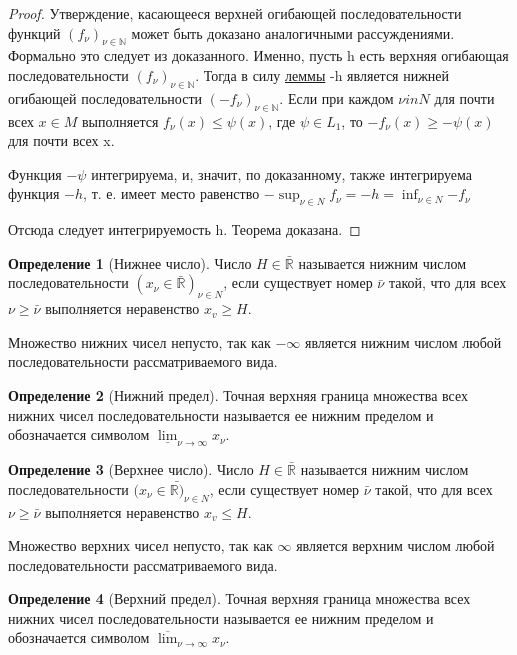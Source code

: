 \documentclass[a4paper]{article}
\theoremstyle{definition}
\newtheorem*{definition}{Определение}
\theoremstyle{remark}
\begin{document}
\begin{proof}
          Утверждение, касающееся верхней огибающей последовательности 
          функций $(f_\nu)_{\nu\in \mathbb{N}}$ может быть доказано аналогичными рассуждениями. 
          Формально это следует из доказанного. Именно, пусть h есть  
          верхняя огибающая последовательности $(f_\nu)_{\nu\in \mathbb{N}}$. Тогда в силу \hyperlink{l4.2}{леммы}
          -h является нижней огибающей последовательности $(-f_\nu)_{\nu\in \mathbb{N}}$.
          Если при каждом $\nu in N$ для почти всех $x\in M$ выполняется $f_\nu(x)\leq \psi(x)$, где 
          $\psi\in L_1$, то $-f_\nu(x)\geq -\psi(x)$ для почти всех x.

          Функция $-\psi$ интегрируема, и, значит, по доказанному, также  
          интегрируема функция $-h$, т. е. имеет место равенство 
          $-\sup_{\nu \in N}{f_\nu} =- h = \inf_{\nu \in N}{-f_\nu}$ 

          Отсюда следует интегрируемость h. Теорема доказана. 
     \end{proof}
     \begin{definition}[Нижнее число]
          Число $H\in \bar{\mathbb{R}} $
          называется нижним числом последовательности $(x_\nu \in \bar{\mathbb{R}})_{\nu \in N}$, если существует 
          номер $\bar{\nu} $ такой, что для всех $\nu \geq \bar{\nu} $ выполняется неравенство $x_v \geq H$. 
     \end{definition}
     Множество нижних чисел непусто, так как $-\infty$ является нижним 
     числом любой последовательности рассматриваемого вида. 
     \begin{definition}[Нижний предел]
          Точная верхняя граница множества всех нижних чисел  
          последовательности называется ее нижним пределом и обозначается символом 
          $\underline{\lim}_{\nu \to \infty}x_\nu$. 
     \end{definition}
     \begin{definition}[Верхнее число]
          Число $H\in \bar{\mathbb{R}} $
          называется нижним числом последовательности $(x_\nu \in \bar{\mathbb{R})}_{\nu \in N}$, если существует 
          номер $\bar{\nu} $ такой, что для всех $\nu \geq \bar{\nu} $ выполняется неравенство $x_v \leq H$. 
     \end{definition}
     Множество верхних чисел непусто, так как $\infty$ является верхним
     числом любой последовательности рассматриваемого вида. 
     \begin{definition}[Верхний предел]
          Точная верхняя граница множества всех нижних чисел  
          последовательности называется ее нижним пределом и обозначается символом 
          $\overline{\lim} _{\nu \to \infty}x_\nu$. 
     \end{definition}
\end{document}
